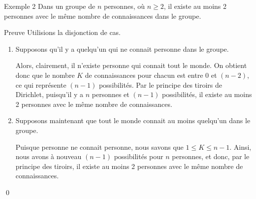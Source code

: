 \documentclass[a4paper]{article}
\begin{document}
\begin{parag}{Exemple 2}
    Dans un groupe de $n$ personnes, où $n \geq 2$, il existe au moins 2 personnes avec le même nombre de connaissances dans le groupe.

    \begin{subparag}{Preuve}
        Utilisions la disjonction de cas.

        \begin{enumerate}[left=0pt]
            \item Supposons qu'il y a quelqu'un qui ne connait personne dans le groupe.

                Alors, clairement, il n'existe personne qui connait tout le monde. On obtient donc que le nombre $K$ de connaissances pour chacun est entre 0 et $\left(n-2\right)$, ce qui représente $\left(n-1\right)$ possibilités. Par le principe des tiroirs de Dirichlet, puisqu'il y a $n$ personnes et $\left(n-1\right)$ possibilités, il existe au moins 2 personnes avec le même nombre de connaissances.
            \item Supposons maintenant que tout le monde connait au moins quelqu'un dans le groupe.

                Puisque personne ne connait personne, nous savons que $1 \leq K \leq n-1$. Ainsi, nous avons à nouveau $\left(n-1\right)$ possibilités pour $n$ personnes, et donc, par le principe des tiroirs, il existe au moins 2 personnes avec le même nombre de connaissances.
        \end{enumerate}
        
        \qed
    \end{subparag}
\end{parag}
\end{document}
